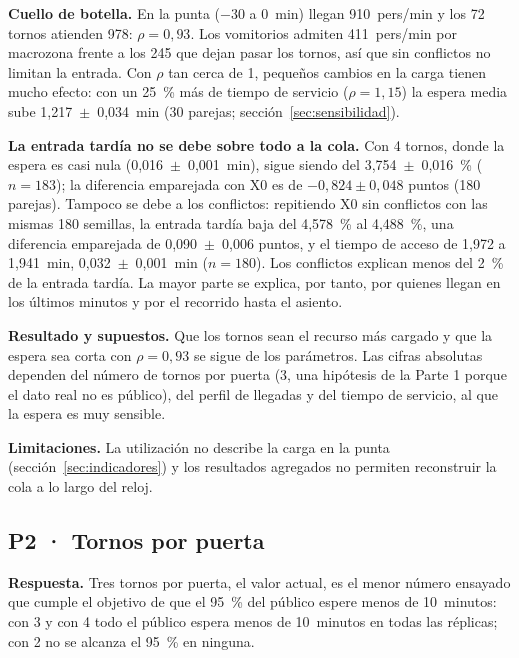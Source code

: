 \textbf{Cuello de botella.} En la punta ($-30$ a 0~min) llegan 910~pers/min y los
72 tornos atienden 978: $\rho=0{,}93$. Los vomitorios admiten 411~pers/min por
macrozona frente a los 245 que dejan pasar los tornos, así que sin conflictos no
limitan la entrada. Con $\rho$ tan cerca de 1, pequeños cambios en la carga
tienen mucho efecto: con un 25~\% más de tiempo de servicio ($\rho=1{,}15$) la
espera media sube 1,217~$\pm$~0,034~min (30 parejas;
sección~\ref{sec:sensibilidad}).

\textbf{La entrada tardía no se debe sobre todo a la cola.} Con 4 tornos, donde la
espera es casi nula (0,016~$\pm$~0,001~min), sigue siendo del
3,754~$\pm$~0,016~\% ($n=183$); la diferencia emparejada con X0 es de
$-0{,}824 \pm 0{,}048$ puntos (180 parejas). Tampoco se debe a los conflictos: repitiendo X0 sin conflictos con las mismas
180 semillas, la entrada tardía baja del 4,578~\% al 4,488~\%, una diferencia
emparejada de 0,090~$\pm$~0,006 puntos, y el tiempo de acceso de 1,972 a
1,941~min, 0,032~$\pm$~0,001~min ($n=180$). Los conflictos explican menos del
2~\% de la entrada tardía. La mayor parte se explica, por tanto, por quienes
llegan en los últimos minutos y por el recorrido hasta el asiento.

\textbf{Resultado y supuestos.} Que los tornos sean el recurso más cargado y que la
espera sea corta con $\rho=0{,}93$ se sigue de los parámetros. Las cifras
absolutas dependen del número de tornos por puerta (3, una hipótesis de la Parte 1
porque el dato real no es público), del perfil de llegadas y del tiempo de
servicio, al que la espera es muy sensible.

\textbf{Limitaciones.} La utilización no describe la carga en la punta
(sección~\ref{sec:indicadores}) y los resultados agregados no permiten
reconstruir la cola a lo largo del reloj.

\subsection{P2 · Tornos por puerta}

\textbf{Respuesta.} Tres tornos por puerta, el valor actual, es el menor número
ensayado que cumple el objetivo de que el 95~\% del público espere menos de
10~minutos: con 3 y con 4 todo el público espera menos de 10~minutos en todas las
réplicas; con 2 no se alcanza el 95~\% en ninguna.

